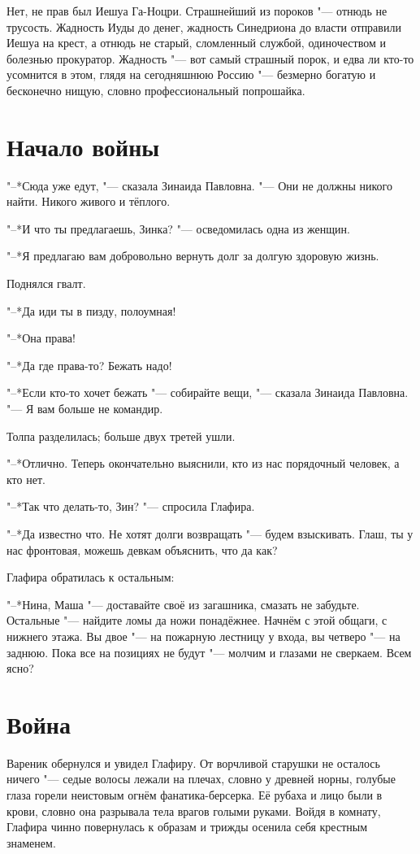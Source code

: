 Нет, не прав был Иешуа Га-Ноцри.
Страшнейший из пороков "--- отнюдь не трусость. 
Жадность Иуды до денег, жадность Синедриона до власти отправили Иешуа на крест, а отнюдь не старый, сломленный службой, одиночеством и болезнью прокуратор.
Жадность "--- вот самый страшный порок, и едва ли кто-то усомнится в этом, глядя на сегодняшнюю Россию "--- безмерно богатую и бесконечно нищую, словно профессиональный попрошайка.

\section{Начало войны}

"--*Сюда уже едут, "--- сказала Зинаида Павловна.
"--- Они не должны никого найти.
Никого живого и тёплого.

"--*И что ты предлагаешь, Зинка? "--- осведомилась одна из женщин.

"--*Я предлагаю вам добровольно вернуть долг за долгую здоровую жизнь.

Поднялся гвалт.

"--*Да иди ты в пизду, полоумная!

"--*Она права!

"--*Да где права-то?
Бежать надо!

"--*Если кто-то хочет бежать "--- собирайте вещи, "--- сказала Зинаида Павловна.
"--- Я вам больше не командир.

Толпа разделилась;
больше двух третей ушли.

"--*Отлично.
Теперь окончательно выяснили, кто из нас порядочный человек, а кто нет.

"--*Так что делать-то, Зин? "--- спросила Глафира.

"--*Да известно что.
Не хотят долги возвращать "--- будем взыскивать.
Глаш, ты у нас фронтовая, можешь девкам объяснить, что да как?

Глафира обратилась к остальным:

"--*Нина, Маша "--- доставайте своё из загашника, смазать не забудьте.
Остальные "--- найдите ломы да ножи понадёжнее.
Начнём с этой общаги, с нижнего этажа.
Вы двое "--- на пожарную лестницу у входа, вы четверо "--- на заднюю.
Пока все на позициях не будут "--- молчим и глазами не сверкаем.
Всем ясно? 

\section{Война}

Вареник обернулся и увидел Глафиру.
От ворчливой старушки не осталось ничего "--- седые волосы лежали на плечах, словно у древней норны, голубые глаза горели неистовым огнём фанатика-берсерка.
Её рубаха и лицо были в крови, словно она разрывала тела врагов голыми руками.
Войдя в комнату, Глафира чинно повернулась к образам и трижды осенила себя крестным знаменем.

